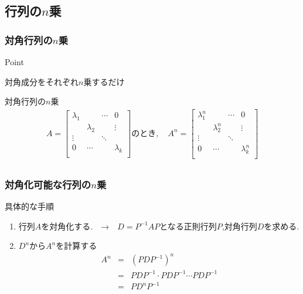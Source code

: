 \documentclass[a4paper]{jsarticle}
\begin{document}
\subsection{行列の$n$乗}
\subsubsection{対角行列の$n$乗}
\begin{itembox}[l]{Point}
    \begin{center}
        対角成分をそれぞれ$n$乗するだけ
    \end{center}
\end{itembox}
\begin{itembox}[l]{対角行列の$n$乗}
    \begin{eqnarray*}
        A=
        \begin{bmatrix}
            \lambda_1 &           & \cdots & 0         \\
                      & \lambda_2 &        & \vdots    \\
            \vdots    &           & \ddots &           \\
            0         & \cdots    &        & \lambda_k \\
        \end{bmatrix}
        のとき,\quad A^n=
        \begin{bmatrix}
            \lambda_1^n &             & \cdots & 0           \\
                        & \lambda_2^n &        & \vdots      \\
            \vdots      &             & \ddots &             \\
            0           & \cdots      &        & \lambda_k^n \\
        \end{bmatrix}\\
    \end{eqnarray*}
\end{itembox}
\subsubsection{対角化可能な行列の$n$乗}
\begin{itembox}[l]{具体的な手順}
    \begin{enumerate}
        \item 行列$A$を対角化する.　→　$D=P^{-1}AP$となる正則行列$P$,対角行列$D$を求める.
        \item $D^n$から$A^n$を計算する
              \begin{eqnarray*}
                  A^n
                  &=&\left(PDP^{-1}\right)^n\\
                  &=&PDP^{-1}\cdot PDP^{-1}\cdots PDP^{-1}\\
                  &=&PD^nP^{-1}\\
              \end{eqnarray*}
    \end{enumerate}
\end{itembox}
\newpage
\end{document}
